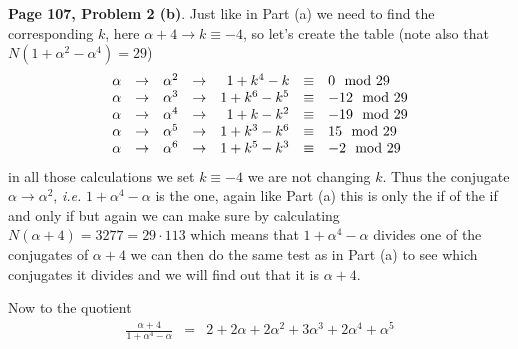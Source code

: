 \documentclass[aps,preprint,preprintnumbers,nofootinbib,showpacs,prd]{revtex4-1}
\newcommand{\ie}{{\it i.e.} }
\newcommand{\nbea}{\begin{eqnarray*}}
\newcommand{\neea}{\end{eqnarray*}}
\begin{document}
{\bf Page 107, Problem 2 (b)}. Just like in Part (a) we need to find the corresponding $k$, here $\alpha + 4 \to k \equiv -4$, so let's create the table (note also that $N(1 + \alpha^2 - \alpha^4) = 29$)
%
\nbea
\begin{array}{r c l c r c l}
\alpha & \to & \alpha^2 & \to & 1 + k^4 - k & \equiv & 0 \mod{29} \\
\alpha & \to & \alpha^3 & \to & 1 + k^6 - k^5 & \equiv & -12 \mod{29} \\
\alpha & \to & \alpha^4 & \to & 1 + k - k^2 & \equiv & -19 \mod{29} \\
\alpha & \to & \alpha^5 & \to & 1 + k^3 - k^6 & \equiv & 15 \mod{29} \\
\alpha & \to & \alpha^6 & \to & 1 + k^5 - k^3 & \equiv & -2 \mod{29} 
\end{array}
\neea
%
in all those calculations we set $k \equiv -4$ we are not changing $k$. Thus the conjugate $\alpha \to \alpha^2$, \ie $1 + \alpha^4 - \alpha$ is the one, again like Part (a) this is only the if of the if and only if but again we can make sure by calculating $N(\alpha + 4) = 3277 = 29 \cdot 113$ which means that $1 + \alpha^4 - \alpha$ divides one of the conjugates of $\alpha + 4$ we can then do the same test as in Part (a) to see which conjugates it divides and we will find out that it is $\alpha + 4$.

Now to the quotient
%
\nbea
\frac{\alpha + 4}{1 + \alpha^4 - \alpha} & = & 2 + 2\alpha + 2\alpha^2 + 3\alpha^3 + 2\alpha^4 + \alpha^5
\neea
%
\end{document}
